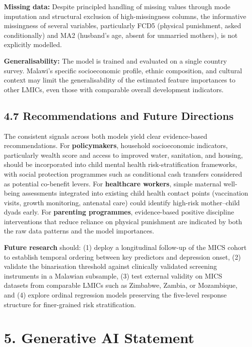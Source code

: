 \documentclass[11pt]{article}
\begin{document}
\textbf{Missing data:} Despite principled handling of missing values
through mode imputation and structural exclusion of high-missingness
columns, the informative missingness of several variables, particularly
FCD5 (physical punishment, asked conditionally) and MA2 (husband's age,
absent for unmarried mothers), is not explicitly modelled.

\textbf{Generalisability:} The model is trained and evaluated on a
single country survey. Malawi's specific socioeconomic profile, ethnic
composition, and cultural context may limit the generalisability of the
estimated feature importances to other LMICs, even those with comparable
overall development indicators.

    \hypertarget{recommendations-and-future-directions}{%
\subsection{4.7 Recommendations and Future
Directions}\label{recommendations-and-future-directions}}

The consistent signals across both models yield clear evidence-based
recommendations. For \textbf{policymakers}, household socioeconomic
indicators, particularly wealth score and access to improved water,
sanitation, and housing, should be incorporated into child mental health
risk-stratification frameworks, with social protection programmes such
as conditional cash transfers considered as potential co-benefit levers.
For \textbf{healthcare workers}, simple maternal well-being assessments
integrated into existing child health contact points (vaccination
visits, growth monitoring, antenatal care) could identify high-risk
mother--child dyads early. For \textbf{parenting programmes},
evidence-based positive discipline interventions that reduce reliance on
physical punishment are indicated by both the raw data patterns and the
model importances.

\textbf{Future research} should: (1) deploy a longitudinal follow-up of
the MICS cohort to establish temporal ordering between key predictors
and depression onset, (2) validate the binarisation threshold against
clinically validated screening instruments in a Malawian subsample, (3)
test external validity on MICS datasets from comparable LMICs such as
Zimbabwe, Zambia, or Mozambique, and (4) explore ordinal regression
models preserving the five-level response structure for finer-grained
risk stratification.

    \hypertarget{generative-ai-statement}{%
\section{5. Generative AI Statement}\label{generative-ai-statement}}
\end{document}

